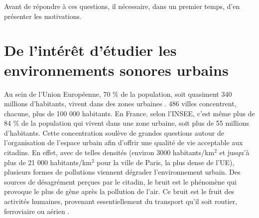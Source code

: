 Avant de répondre à ces questions, il nécessaire, dans un premier temps, d'en présenter les motivations.

\section{De l'intérêt d'étudier les environnements sonores urbains}

Au sein de l'Union Européenne, 70 $\%$ de la population, soit quasiment 340 millions d'habitants, vivent dans des zones urbaines \cite{europ-commission_data_2017}. 486 villes concentrent, chacune, plus de 100 000 habitants. En France, selon l'INSEE, c'est même plus de 84 $\%$ de la population qui vivent dans une zone urbaine, soit plus de 55 millions d'habitants. Cette concentration soulève de grandes questions autour de l'organisation de l'espace urbain afin d'offrir une qualité de vie acceptable aux citadins. En effet, avec de telles densités (environ 3000 habitants/km$^2$ et jusqu'à plus de 21 000  habitants/km$^2$ pour la ville de Paris, la plus dense de l'UE), plusieurs formes de pollutions viennent dégrader l'environnement urbain. Des sources de désagrément perçues par le citadin, le bruit est le phénomène qui provoque le plus de gène après la pollution de l'air. Ce bruit est le fruit des activités humaines, provenant essentiellement du transport qu'il soit routier, ferroviaire ou aérien \cite{zannin_characterization_2013}.\\


